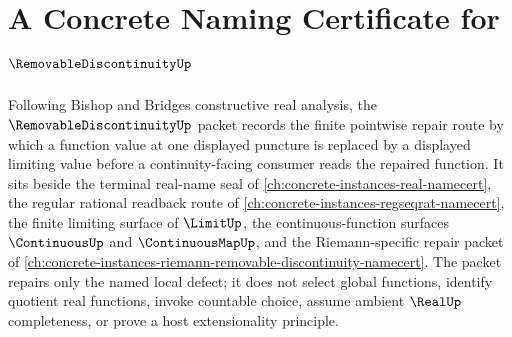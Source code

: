 \chapter{A Concrete Naming Certificate for $\RemovableDiscontinuityUp$}
\label{ch:concrete-instances-removable-discontinuity-namecert}

Following Bishop and Bridges constructive real analysis, the $\RemovableDiscontinuityUp$ packet records the finite pointwise repair route by which a function value at one displayed puncture is replaced by a displayed limiting value before a continuity-facing consumer reads the repaired function. It sits beside the terminal real-name seal of \autoref{ch:concrete-instances-real-namecert}, the regular rational readback route of \autoref{ch:concrete-instances-regseqrat-namecert}, the finite limiting surface of $\LimitUp$, the continuous-function surfaces $\ContinuousUp$ and $\ContinuousMapUp$, and the Riemann-specific repair packet of \autoref{ch:concrete-instances-riemann-removable-discontinuity-namecert}. The packet repairs only the named local defect; it does not select global functions, identify quotient real functions, invoke countable choice, assume ambient $\RealUp$ completeness, or prove a host extensionality principle.


